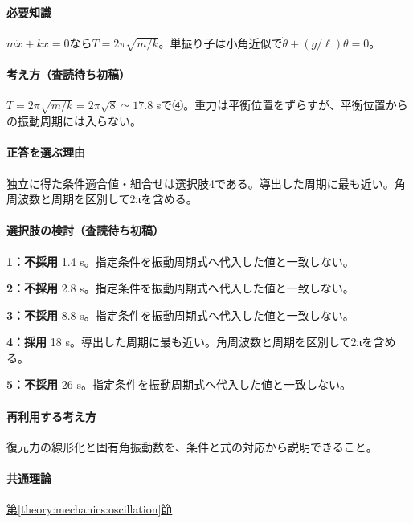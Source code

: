 \paragraph{必要知識} \(m\ddot x+kx=0\)なら\(T=2\pi\sqrt{m/k}\)。単振り子は小角近似で\(\ddot\theta+(g/\ell)\theta=0\)。

\paragraph{考え方（査読待ち初稿）} \(T=2\pi\sqrt{m/k}=2\pi\sqrt8\simeq17.8\) sで④。重力は平衡位置をずらすが、平衡位置からの振動周期には入らない。

\paragraph{正答を選ぶ理由} 独立に得た条件適合値・組合せは選択肢4である。導出した周期に最も近い。角周波数と周期を区別して2πを含める。

\paragraph{選択肢の検討（査読待ち初稿）}\mbox{}\par

\noindent\textbf{1：不採用} 1.4 s。指定条件を振動周期式へ代入した値と一致しない。\par

\noindent\textbf{2：不採用} 2.8 s。指定条件を振動周期式へ代入した値と一致しない。\par

\noindent\textbf{3：不採用} 8.8 s。指定条件を振動周期式へ代入した値と一致しない。\par

\noindent\textbf{4：採用} 18 s。導出した周期に最も近い。角周波数と周期を区別して2πを含める。\par

\noindent\textbf{5：不採用} 26 s。指定条件を振動周期式へ代入した値と一致しない。\par

\paragraph{再利用する考え方} 復元力の線形化と固有角振動数を、条件と式の対応から説明できること。

\paragraph{共通理論} \hyperref[theory:mechanics:oscillation]{第\ref*{theory:mechanics:oscillation}節}

